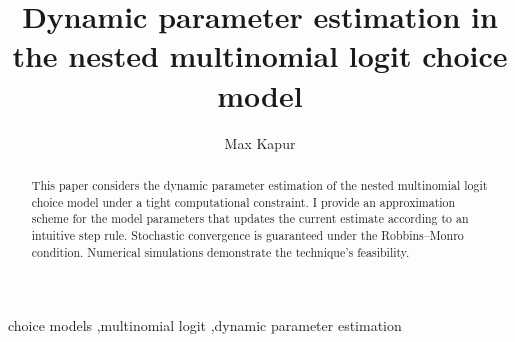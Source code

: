 \documentclass[preprint,12pt,authoryear]{elsarticle}
\begin{document}
\begin{frontmatter}


 \title{Dynamic parameter estimation in the nested multinomial logit choice model}
 \author{Max Kapur}
 \address{Seoul National University, Department of Industrial Engineering, 1 Gwanak-ro, Gwanak-gu, Seoul 08826, Republic of Korea}

\begin{abstract}
This paper considers the dynamic parameter estimation of the nested multinomial logit choice model under a tight computational constraint. I provide an approximation scheme for the model parameters that updates the current estimate according to an intuitive step rule. Stochastic convergence is guaranteed under the Robbins--Monro condition. Numerical simulations demonstrate the technique's feasibility.
\end{abstract}



\begin{keyword}
choice models \sep multinomial logit \sep dynamic parameter estimation



\end{keyword}

\end{frontmatter}
\end{document}
